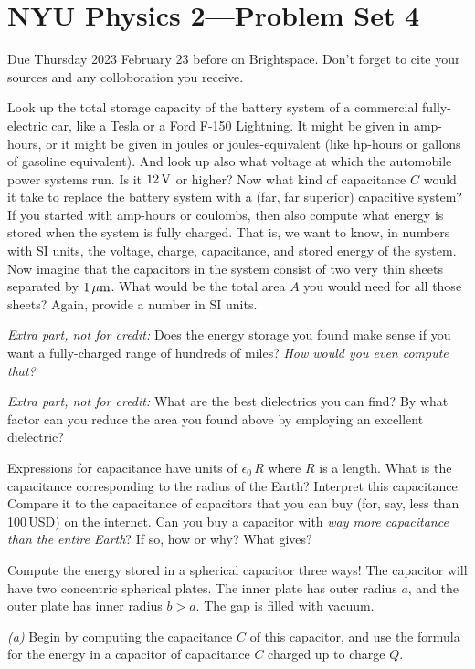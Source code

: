 \documentclass[12pt]{article}
\begin{document}
\section*{NYU Physics 2---Problem Set 4}

Due Thursday 2023 February 23 before on Brightspace.
Don't forget to cite your sources and any colloboration you receive.

\startproblem
Look up the total storage capacity of the battery system of a
commercial fully-electric car, like a Tesla or a Ford F-150 Lightning. It might
be given in amp-hours, or it might be given in joules or
joules-equivalent (like hp-hours or gallons of gasoline
equivalent). And look up also what voltage at which the automobile
power systems run. Is it $12\,\mathrm{V}$ or higher? Now what kind of
capacitance $C$ would it take to replace the battery system with a
(far, far superior) capacitive system? If you started with amp-hours
or coulombs, then also compute what energy is stored when the system
is fully charged. That is, we want to know, in numbers with SI units, the voltage,
charge, capacitance, and stored energy of the system. Now imagine that
the capacitors in the system consist of two very thin sheets separated
by $1\,\mathrm{\mu m}$.  What would be the total area $A$ you would need for all
those sheets? Again, provide a number in SI units.

\emph{Extra part, not for credit:} Does the energy storage you found
make sense if you want a fully-charged range of hundreds of miles? \emph{How
would you even compute that?}

\emph{Extra part, not for credit:} What are the best dielectrics you can find?
By what factor can you reduce the area you found above by employing an excellent
dielectric?

\startproblem
Expressions for capacitance have units of $\epsilon_0\,R$ where $R$ is a length.
What is the capacitance corresponding to the radius of the Earth?
Interpret this capacitance.
Compare it to the capacitance of capacitors that you can buy (for,
say, less than 100\,USD) on the internet.
Can you buy a capacitor with \emph{way more capacitance than the entire
  Earth}?
If so, how or why? What gives?

\startproblem
Compute the energy stored in a spherical capacitor three ways!
The capacitor will have two concentric spherical plates.
The inner plate has outer radius $a$, and the outer plate has
inner radius $b>a$.
The gap is filled with vacuum.

\textsl{(a)}
Begin by computing the capacitance $C$ of this capacitor, and
use the formula for the energy in a capacitor of capacitance $C$
charged up to charge $Q$.
\end{document}
